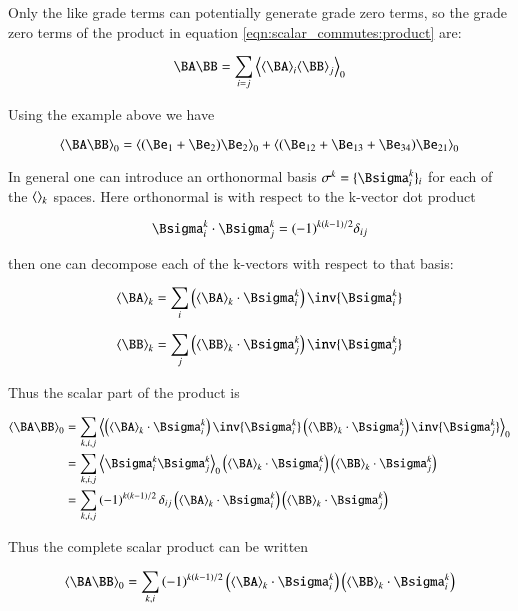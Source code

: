Only the like grade terms can potentially generate grade zero terms, so the grade zero terms of the product in equation \ref{eqn:scalar_commutes:product} are:

\begin{equation}\label{eqn:scalar_commutes:scalarproduct}
\BA \BB 
= \sum_{i=j} \gpgradezero{\gpgrade{\BA}{i} \gpgrade{\BB}{j}}
\end{equation}

Using the example above we have

\[
\gpgradezero{\BA \BB}
= \gpgradezero{ (\Be_1 + \Be_2)\Be_2 }
+ \gpgradezero{ (\Be_{12} + \Be_{13} + \Be_{34})\Be_{21} }
\]

In general one can introduce an orthonormal basis 
$\sigma^k = \{\Bsigma_i^k\}_i$ for each of the ${\left\langle{{}}\right\rangle}_{k}$ spaces.
Here orthonormal is with respect to the k-vector dot product

\begin{equation}\label{eqn:scalar_commutes:orthonormal}
\Bsigma_i^k \cdot \Bsigma_j^k = (-1)^{k(k-1)/2}\delta_{ij}
\end{equation}

then one can decompose each of the k-vectors with respect to that
basis:

\[
\gpgrade{\BA}{k} = \sum_i \left(\gpgrade{\BA}{k} \cdot \Bsigma_i^k\right) \inv{\Bsigma_i^k}
\]

\[
\gpgrade{\BB}{k} = \sum_{j} \left(\gpgrade{\BB}{k} \cdot \Bsigma_{j}^k\right) \inv{\Bsigma_{j}^k}
\]

Thus the scalar part of the product is 

\begin{align*}
\gpgradezero{\BA \BB} 
&= \sum_{k, i, j} \gpgradezero {
\left(\gpgrade{\BA}{k} \cdot \Bsigma_{i}^k\right) \inv{\Bsigma_{i}^k}
\left(\gpgrade{\BB}{k} \cdot \Bsigma_{j}^k\right) \inv{\Bsigma_{j}^k}
} \\
&= \sum_{k, i, j}
\gpgradezero { \Bsigma_{i}^k \Bsigma_{j}^k } 
\left(\gpgrade{\BA}{k} \cdot \Bsigma_{i}^k\right)
\left(\gpgrade{\BB}{k} \cdot \Bsigma_{j}^k\right) \\
&= \sum_{k, i, j}
\left(-1\right)^{k\left(k-1\right)/2} \delta_{ij}
\left(\gpgrade{\BA}{k} \cdot \Bsigma_{i}^k\right)
\left(\gpgrade{\BB}{k} \cdot \Bsigma_{j}^k\right)
\end{align*}

Thus the complete scalar product can be written

\begin{equation}
\gpgradezero{\BA \BB} = \sum_{k, i}
\left(-1\right)^{k\left(k-1\right)/2}
\left(\gpgrade{\BA}{k} \cdot \Bsigma_{i}^k\right)
\left(\gpgrade{\BB}{k} \cdot \Bsigma_{i}^k\right)
\end{equation}

